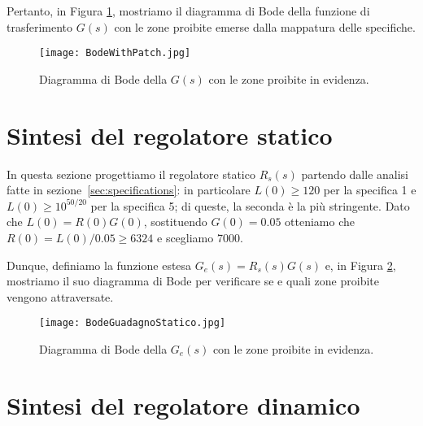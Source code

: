 \documentclass[a4paper, 11pt]{article}
\begin{document}
	Pertanto, in Figura \ref{fig:patchedG}, mostriamo il diagramma di Bode della funzione di trasferimento $G(s)$ con le zone proibite emerse dalla mappatura delle specifiche.
	
	\begin{figure}[h!]
		\centering
		\texttt{[image: BodeWithPatch.jpg]}
		\caption{Diagramma di Bode della $G(s)$ con le zone proibite in evidenza.}
		\label{fig:patchedG}
	\end{figure}
	
	\newpage
	
	\section{Sintesi del regolatore statico}
	\label{sec:static_regulator}
	
	In questa sezione progettiamo il regolatore statico $R_s(s)$ partendo dalle analisi fatte in sezione~\ref{sec:specifications}: in particolare $L(0) \ge 120$ per la specifica 1 e $L(0) \ge 10^{50/20}$ per la specifica 5; di queste, la seconda è la più stringente. Dato che $L(0) = R(0)G(0)$, sostituendo $G(0) = 0.05$ otteniamo che $R(0) = L(0)/0.05 \ge 6324$ e scegliamo 7000.
	
	Dunque, definiamo la funzione estesa $G_e(s) = R_s(s)G(s)$ e, in Figura \ref{fig:Ge}, mostriamo il suo diagramma di Bode per verificare se e quali zone proibite vengono attraversate.
	
	\begin{figure}[h!]
		\centering
		\texttt{[image: BodeGuadagnoStatico.jpg]}
		\caption{Diagramma di Bode della $G_e(s)$ con le zone proibite in evidenza.}
		\label{fig:Ge}
	\end{figure}
	
	\newpage
	
	\section{Sintesi del regolatore dinamico}
	
\end{document}
